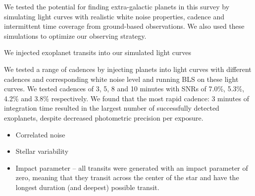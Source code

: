 
We tested the potential for finding extra-galactic planets in this survey by
simulating light curves with realistic white noise properties, cadence and
intermittent time coverage from ground-based observations.
We also used these simulations to optimize our observing strategy.

We injected exoplanet transits into our simulated light curves


We tested a range of cadences by injecting planets into light curves with
different cadences and corresponding white noise level and running BLS on
these light curves.
We tested cadences of 3, 5, 8 and 10 minutes with SNRs of 7.0\%, 5.3\%, 4.2\%
and 3.8\% respectively.
We found that the most rapid cadence: 3 minutes of integration time resulted
in the largest number of successfully detected exoplanets, despite decreased
photometric precision per exposure.


\begin{itemize}
\item{Correlated noise}
\item{Stellar variability}
\item{Impact parameter -- all transits were generated with an impact
parameter of zero, meaning that they transit across the center of the star and
have the longest duration (and deepest) possible transit.}
\end{itemize}



